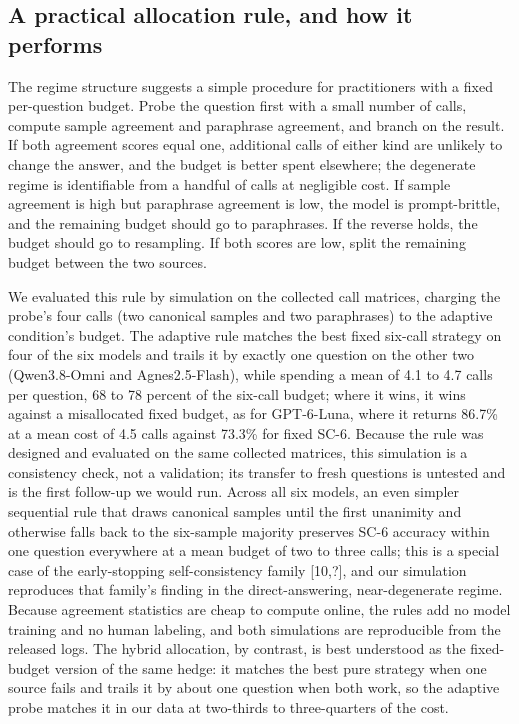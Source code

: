 \documentclass[preprint,12pt]{elsarticle}
\begin{document}
\subsection{A practical allocation rule, and how it performs}

The regime structure suggests a simple procedure for practitioners with a fixed per-question budget. Probe the question first with a small number of calls, compute sample agreement and paraphrase agreement, and branch on the result. If both agreement scores equal one, additional calls of either kind are unlikely to change the answer, and the budget is better spent elsewhere; the degenerate regime is identifiable from a handful of calls at negligible cost. If sample agreement is high but paraphrase agreement is low, the model is prompt-brittle, and the remaining budget should go to paraphrases. If the reverse holds, the budget should go to resampling. If both scores are low, split the remaining budget between the two sources.

We evaluated this rule by simulation on the collected call matrices, charging the probe's four calls (two canonical samples and two paraphrases) to the adaptive condition's budget. The adaptive rule matches the best fixed six-call strategy on four of the six models and trails it by exactly one question on the other two (Qwen3.8-Omni and Agnes2.5-Flash), while spending a mean of 4.1 to 4.7 calls per question, 68 to 78 percent of the six-call budget; where it wins, it wins against a misallocated fixed budget, as for GPT-6-Luna, where it returns 86.7\% at a mean cost of 4.5 calls against 73.3\% for fixed SC-6. Because the rule was designed and evaluated on the same collected matrices, this simulation is a consistency check, not a validation; its transfer to fresh questions is untested and is the first follow-up we would run. Across all six models, an even simpler sequential rule that draws canonical samples until the first unanimity and otherwise falls back to the six-sample majority preserves SC-6 accuracy within one question everywhere at a mean budget of two to three calls; this is a special case of the early-stopping self-consistency family [10,?], and our simulation reproduces that family's finding in the direct-answering, near-degenerate regime. Because agreement statistics are cheap to compute online, the rules add no model training and no human labeling, and both simulations are reproducible from the released logs. The hybrid allocation, by contrast, is best understood as the fixed-budget version of the same hedge: it matches the best pure strategy when one source fails and trails it by about one question when both work, so the adaptive probe matches it in our data at two-thirds to three-quarters of the cost.
\end{document}
